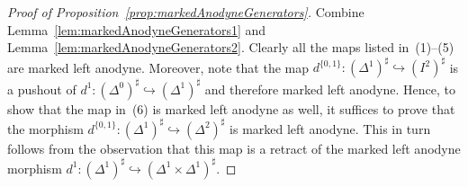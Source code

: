 \documentclass[reqno]{amsart}
\numberwithin{equation}{subsection}
\theoremstyle{plain}
\theoremstyle{definition}
\let\into=\hookrightarrow
\begin{document}
\begin{proof}[{Proof of Proposition~\ref{prop:markedAnodyneGenerators}}]
	Combine Lemma~\ref{lem:markedAnodyneGenerators1} and Lemma~\ref{lem:markedAnodyneGenerators2}.
	\iffalse 
	Clearly all the maps listed in~(1)--(5) are marked left anodyne. Moreover, note that the map $d^{\{0,1\}}\colon (\Delta^1)^\sharp\into (I^2)^\sharp$ is a pushout of $d^1\colon (\Delta^0)^\sharp\into(\Delta^1)^\sharp$ and therefore marked left anodyne. Hence, to show that the map in~(6) is marked left anodyne as well, it suffices to prove that the morphism $d^{\{0,1\}}\colon (\Delta^1)^\sharp\into(\Delta^2)^\sharp$ is marked left anodyne. This in turn follows from the observation that this map is a retract of the marked left anodyne morphism $d^1\colon (\Delta^1)^\sharp\into(\Delta^1\times\Delta^1)^\sharp$.


\end{proof}
\end{document}
